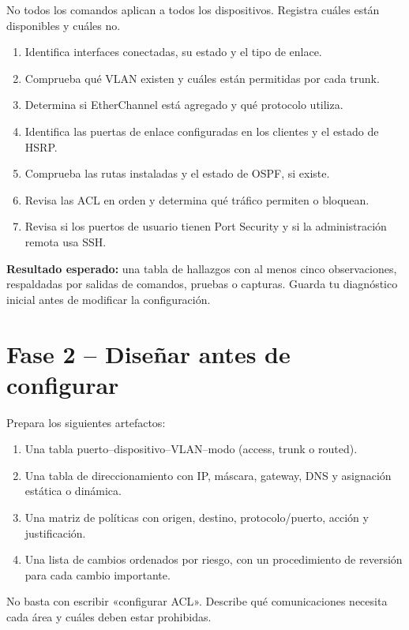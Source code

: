 \documentclass[12pt,a4paper]{article}
\begin{document}
No todos los comandos aplican a todos los dispositivos. Registra cuáles están disponibles y cuáles no.
\begin{enumerate}[leftmargin=1.2cm]
 \item Identifica interfaces conectadas, su estado y el tipo de enlace.
 \item Comprueba qué VLAN existen y cuáles están permitidas por cada trunk.
 \item Determina si EtherChannel está agregado y qué protocolo utiliza.
 \item Identifica las puertas de enlace configuradas en los clientes y el estado de HSRP.
 \item Comprueba las rutas instaladas y el estado de OSPF, si existe.
 \item Revisa las ACL en orden y determina qué tráfico permiten o bloquean.
 \item Revisa si los puertos de usuario tienen Port Security y si la administración remota usa SSH.
\end{enumerate}

\textbf{Resultado esperado:} una tabla de hallazgos con al menos cinco observaciones, respaldadas por salidas de comandos, pruebas o capturas. Guarda tu diagnóstico inicial antes de modificar la configuración.

\section{Fase 2 -- Diseñar antes de configurar}

Prepara los siguientes artefactos:
\begin{enumerate}[leftmargin=1.2cm]
 \item Una tabla puerto--dispositivo--VLAN--modo (access, trunk o routed).
 \item Una tabla de direccionamiento con IP, máscara, gateway, DNS y asignación estática o dinámica.
 \item Una matriz de políticas con origen, destino, protocolo/puerto, acción y justificación.
 \item Una lista de cambios ordenados por riesgo, con un procedimiento de reversión para cada cambio importante.
\end{enumerate}

No basta con escribir «configurar ACL». Describe qué comunicaciones necesita cada área y cuáles deben estar prohibidas.
\end{document}
